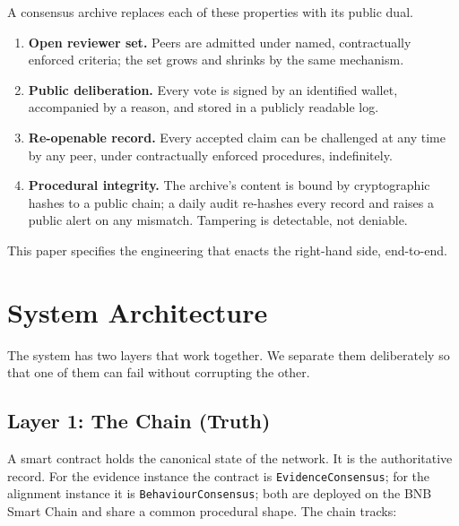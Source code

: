 \documentclass[11pt,a4paper]{article}
\begin{document}
A consensus archive replaces each of these properties with its
public dual.

\begin{enumerate}[leftmargin=1.5em]
  \item \textbf{Open reviewer set.} Peers are admitted under
        named, contractually enforced criteria; the set grows
        and shrinks by the same mechanism.
  \item \textbf{Public deliberation.} Every vote is signed by an
        identified wallet, accompanied by a reason, and stored
        in a publicly readable log.
  \item \textbf{Re-openable record.} Every accepted claim can be
        challenged at any time by any peer, under contractually
        enforced procedures, indefinitely.
  \item \textbf{Procedural integrity.} The archive's content is
        bound by cryptographic hashes to a public chain; a daily
        audit re-hashes every record and raises a public alert
        on any mismatch. Tampering is detectable, not
        deniable.
\end{enumerate}

This paper specifies the engineering that enacts the right-hand
side, end-to-end.

\section{System Architecture}

The system has two layers that work together. We separate them
deliberately so that one of them can fail without corrupting the
other.

\subsection{Layer 1: The Chain (Truth)}

A smart contract holds the canonical state of the network. It is
the authoritative record. For the evidence instance the contract
is \texttt{EvidenceConsensus}; for the alignment instance it is
\texttt{BehaviourConsensus}; both are deployed on the BNB Smart
Chain and share a common procedural shape. The chain tracks:
\end{document}
